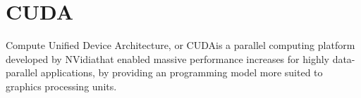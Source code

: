 \section{CUDA}
\label{sec:cuda}


Compute Unified Device Architecture, or CUDA\tm is a parallel computing platform developed by NVidia\tr that enabled massive performance increases for highly data-parallel applications, by providing an programming model more suited to graphics processing units.

